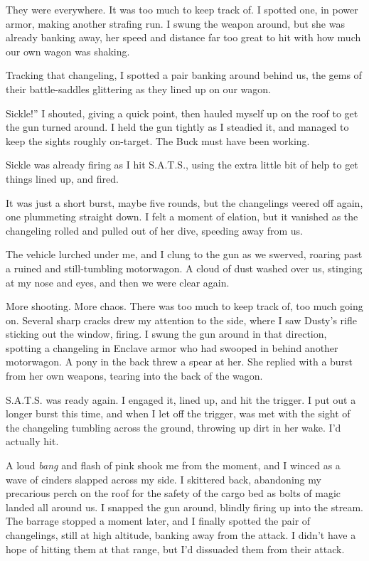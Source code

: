 They were everywhere. It was too much to keep track of. I spotted one, in power armor, making another strafing run. I swung the weapon around, but she was already banking away, her speed and distance far too great to hit with how much our own wagon was shaking.

Tracking that changeling, I spotted a pair banking around behind us, the gems of their battle-saddles glittering as they lined up on our wagon.

\leavevmode{}Sickle!” I shouted, giving a quick point, then hauled myself up on the roof to get the gun turned around. I held the gun tightly as I steadied it, and managed to keep the sights roughly on-target. The Buck must have been working.

Sickle was already firing as I hit S.A.T.S., using the extra little bit of help to get things lined up, and fired.

It was just a short burst, maybe five rounds, but the changelings veered off again, one plummeting straight down. I felt a moment of elation, but it vanished as the changeling rolled and pulled out of her dive, speeding away from us.

The vehicle lurched under me, and I clung to the gun as we swerved, roaring past a ruined and still-tumbling motorwagon. A cloud of dust washed over us, stinging at my nose and eyes, and then we were clear again.

More shooting. More chaos. There was too much to keep track of, too much going on. Several sharp cracks drew my attention to the side, where I saw Dusty’s rifle sticking out the window, firing. I swung the gun around in that direction, spotting a changeling in Enclave armor who had swooped in behind another motorwagon. A pony in the back threw a spear at her. She replied with a burst from her own weapons, tearing into the back of the wagon.

S.A.T.S. was ready again. I engaged it, lined up, and hit the trigger. I put out a longer burst this time, and when I let off the trigger, was met with the sight of the changeling tumbling across the ground, throwing up dirt in her wake. I’d actually hit.

A loud \textit{bang} and flash of pink shook me from the moment, and I winced as a wave of cinders slapped across my side. I skittered back, abandoning my precarious perch on the roof for the safety of the cargo bed as bolts of magic landed all around us. I snapped the gun around, blindly firing up into the stream. The barrage stopped a moment later, and I finally spotted the pair of changelings, still at high altitude, banking away from the attack. I didn’t have a hope of hitting them at that range, but I’d dissuaded them from their attack.

